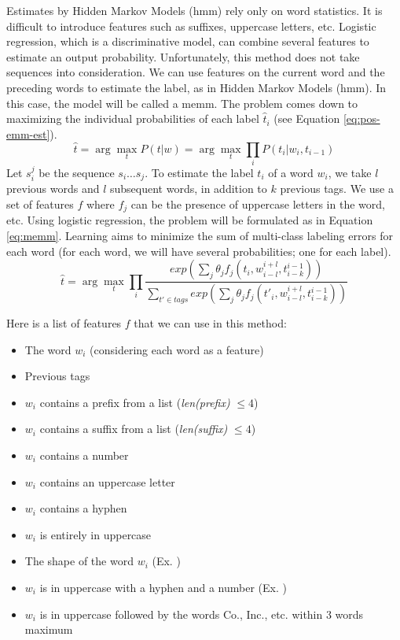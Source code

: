 \documentclass{KBook}
\begin{document}
Estimates by Hidden Markov Models (\ac{hmm}) rely only on word statistics. It is difficult to introduce features such as suffixes, uppercase letters, etc. Logistic regression, which is a discriminative model, can combine several features to estimate an output probability. Unfortunately, this method does not take sequences into consideration. We can use features on the current word and the preceding words to estimate the label, as in Hidden Markov Models (\ac{hmm}). In this case, the model will be called a \acf{memm}. The problem comes down to maximizing the individual probabilities of each label $\hat{t}_i$ (see Equation \ref{eq:pos-emm-est}).
\begin{equation}\label{eq:pos-emm-est}
	\hat{t} = \arg\max\limits_t P(t | w) = \arg\max\limits_t \prod\limits_{i} P(t_i | w_i, t_{i-1})
\end{equation}
Let $s_i^j$ be the sequence $s_i \ldots s_j$. To estimate the label $t_i$ of a word $w_i$, we take $l$ previous words and $l$ subsequent words, in addition to $k$ previous tags. We use a set of features $f$ where $f_j$ can be the presence of uppercase letters in the word, etc. Using logistic regression, the problem will be formulated as in Equation \ref{eq:memm}. Learning aims to minimize the sum of multi-class labeling errors for each word (for each word, we will have several probabilities; one for each label).
\begin{equation}\label{eq:memm}
	\hat{t} = \arg\max\limits_t \prod\limits_{i}  
	\frac{exp\left(\sum_j \theta_j f_j(t_i, w_{i-l}^{i+l}, t_{i-k}^{i-1})\right)}%
	{\sum_{t' \in tags} exp\left(\sum_j \theta_j f_j(t'_i, w_{i-l}^{i+l}, t_{i-k}^{i-1})\right)}
\end{equation}

Here is a list of features $f$ that we can use in this method:
\begin{itemize}
	\item The word $w_i$ (considering each word as a feature)
	\item Previous tags
	\item $w_i$ contains a prefix from a list (\textit{len(prefix)} $\le 4$)
	\item $w_i$ contains a suffix from a list (\textit{len(suffix)} $\le 4$)
	\item $w_i$ contains a number
	\item $w_i$ contains an uppercase letter
	\item $w_i$ contains a hyphen
	\item $w_i$ is entirely in uppercase
	\item The shape of the word $w_i$ (Ex. )
	\item $w_i$ is in uppercase with a hyphen and a number (Ex. )
	\item $w_i$ is in uppercase followed by the words Co., Inc., etc. within 3 words maximum
\end{itemize}
\end{document}
